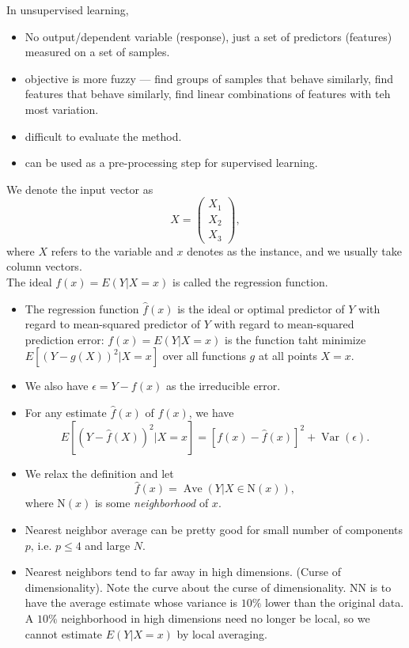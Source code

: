 \documentclass[11pt, a4paper]{article}
\begin{document}
In unsupervised learning,
\begin{itemize}
  \item No output/dependent variable (response), just a set of predictors (features) measured on a set of samples.
  \item objective is more fuzzy --- find groups of samples that behave similarly, find features that behave similarly, find linear combinations of features with teh most variation.
  \item difficult to evaluate the method.
  \item can be used as a pre-processing step for supervised learning.
\end{itemize}
We denote the input vector as 
\[
  X = \begin{pmatrix} 
    X_1\\ X_2 \\ X_3 \end{pmatrix},
\]
where $X$ refers to the variable and $x$ denotes as the instance, and we usually take column vectors.\\
The ideal $f(x)=E(Y|X=x)$ is called the regression function. 
\begin{itemize}
  \item The regression function $\hat{f}(x)$ is the ideal or optimal predictor of $Y$ with regard to mean-squared predictor of $Y$ with regard to mean-squared prediction error: $f(x)=E(Y|X=x)$ is the function taht minimize $E[(Y-g(X))^2|X=x]$ over all functions $g$ at all points $X=x$.
  \item We also have $\epsilon=Y-f(x)$ as the irreducible error.
  \item For any estimate $\hat{f}(x)$ of $f(x)$, we have
\[
  E[(Y-\hat{f}(X))^2|X=x]=[f(x)-\hat{f}(x)]^2+\operatorname{Var}(\epsilon).
\]
\item We relax the definition and let
  \[
    \hat{f}(x)=\operatorname{Ave}(Y|X\in \mathrm{N}(x)),
  \]
  where $\mathrm{N}(x)$ is some \emph{neighborhood} of $x$.
\item Nearest neighbor average can be pretty good for small number of components $p$, i.e. $p\leq 4$ and large $N$.
\item Nearest neighbors tend to far away in high dimensions. (Curse of dimensionality). Note the curve about the curse of dimensionality. NN is to have the average estimate whose variance is $10\%$ lower than the original data. A $10\%$ neighborhood in high dimensions need no longer be local, so we cannot estimate $E(Y|X=x)$ by local averaging. 
\end{itemize}
\end{document}
